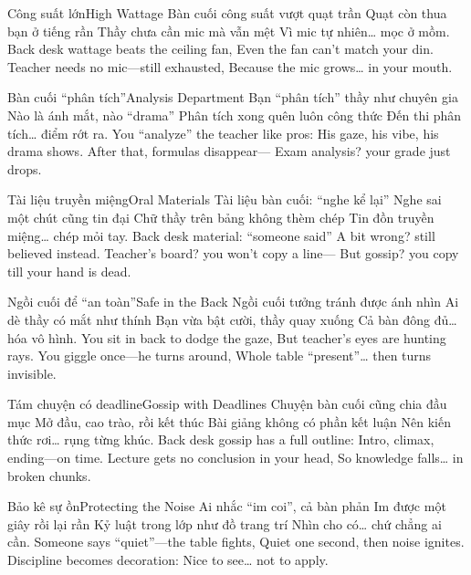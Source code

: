 \begin{tutuyetbox}{Công suất lớn}{High Wattage}
Bàn cuối công suất vượt quạt trần
Quạt còn thua bạn ở tiếng rần
Thầy chưa cần mic mà vẫn mệt
Vì mic tự nhiên… mọc ở mồm.
\tcblower
Back desk wattage beats the ceiling fan,
Even the fan can’t match your din.
Teacher needs no mic—still exhausted,
Because the mic grows… in your mouth.
\end{tutuyetbox}

\begin{tutuyetbox}{Bàn cuối “phân tích”}{Analysis Department}
Bạn “phân tích” thầy như chuyên gia
Nào là ánh mắt, nào “drama”
Phân tích xong quên luôn công thức
Đến thi phân tích… điểm rớt ra.
\tcblower
You “analyze” the teacher like pros:
His gaze, his vibe, his drama shows.
After that, formulas disappear—
Exam analysis? your grade just drops.
\end{tutuyetbox}

\begin{tutuyetbox}{Tài liệu truyền miệng}{Oral Materials}
Tài liệu bàn cuối: “nghe kể lại”
Nghe sai một chút cũng tin đại
Chữ thầy trên bảng không thèm chép
Tin đồn truyền miệng… chép mỏi tay.
\tcblower
Back desk material: “someone said”
A bit wrong? still believed instead.
Teacher’s board? you won’t copy a line—
But gossip? you copy till your hand is dead.
\end{tutuyetbox}

\begin{tutuyetbox}{Ngồi cuối để “an toàn”}{Safe in the Back}
Ngồi cuối tưởng tránh được ánh nhìn
Ai dè thầy có mắt như thính
Bạn vừa bật cười, thầy quay xuống
Cả bàn đông đủ… hóa vô hình.
\tcblower
You sit in back to dodge the gaze,
But teacher’s eyes are hunting rays.
You giggle once—he turns around,
Whole table “present”… then turns invisible.
\end{tutuyetbox}

\begin{tutuyetbox}{Tám chuyện có deadline}{Gossip with Deadlines}
Chuyện bàn cuối cũng chia đầu mục
Mở đầu, cao trào, rồi kết thúc
Bài giảng không có phần kết luận
Nên kiến thức rơi… rụng từng khúc.
\tcblower
Back desk gossip has a full outline:
Intro, climax, ending—on time.
Lecture gets no conclusion in your head,
So knowledge falls… in broken chunks.
\end{tutuyetbox}

\begin{tutuyetbox}{Bảo kê sự ồn}{Protecting the Noise}
Ai nhắc “im coi”, cả bàn phản
Im được một giây rồi lại rần
Kỷ luật trong lớp như đồ trang trí
Nhìn cho có… chứ chẳng ai cần.
\tcblower
Someone says “quiet”—the table fights,
Quiet one second, then noise ignites.
Discipline becomes decoration:
Nice to see… not to apply.
\end{tutuyetbox}

